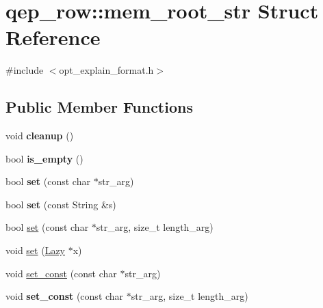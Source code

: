 \hypertarget{structqep__row_1_1mem__root__str}{}\section{qep\+\_\+row\+:\+:mem\+\_\+root\+\_\+str Struct Reference}
\label{structqep__row_1_1mem__root__str}


{\ttfamily \#include $<$opt\+\_\+explain\+\_\+format.\+h$>$}

\subsection*{Public Member Functions}
\begin{DoxyCompactItemize}
\item 
\mbox{\label{structqep__row_1_1mem__root__str_a39f66d16632286130faba84fdeb65f0c}} 
void {\bfseries cleanup} ()
\item 
\mbox{\label{structqep__row_1_1mem__root__str_aba0957b55a230674ed70bd3117e9d069}} 
bool {\bfseries is\+\_\+empty} ()
\item 
\mbox{\label{structqep__row_1_1mem__root__str_a602c7bdb62dec85dbb9c37abc44f0081}} 
bool {\bfseries set} (const char $\ast$str\+\_\+arg)
\item 
\mbox{\label{structqep__row_1_1mem__root__str_afc3f164b7b4cfbf6b206dc8cf348d341}} 
bool {\bfseries set} (const String \&s)
\item 
bool \mbox{\hyperlink{structqep__row_1_1mem__root__str_a0c9b58c93472e9ff67d781a6d740e5ee}{set}} (const char $\ast$str\+\_\+arg, size\+\_\+t length\+\_\+arg)
\item 
void \mbox{\hyperlink{structqep__row_1_1mem__root__str_a71ec1ad030a00be963f8a83e317a05b2}{set}} (\mbox{\hyperlink{classLazy}{Lazy}} $\ast$x)
\item 
void \mbox{\hyperlink{structqep__row_1_1mem__root__str_a6352c7d8d3e2e5e79104d05258511035}{set\+\_\+const}} (const char $\ast$str\+\_\+arg)
\item 
\mbox{\label{structqep__row_1_1mem__root__str_a5e62a7334780ef28de065d78aeac5acf}} 
void {\bfseries set\+\_\+const} (const char $\ast$str\+\_\+arg, size\+\_\+t length\+\_\+arg)
\end{DoxyCompactItemize}
